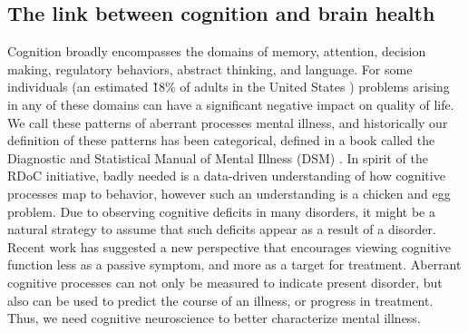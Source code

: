 \documentclass{report}
\begin{document}
\subsection{The link between cognition and brain health}
Cognition broadly encompasses the domains of memory, attention, decision making, regulatory behaviors, abstract thinking, and language. For some individuals (an estimated \~18\% of adults in the United States \cite{Samhsa_undated-fo}) problems arising in any of these domains can have a significant negative impact on quality of life. We call these patterns of aberrant processes mental illness, and historically our definition of these patterns has been categorical, defined in a book called the Diagnostic and Statistical Manual of Mental Illness (DSM) \cite{american2013diagnostic}. In spirit of the RDoC initiative, badly needed is a data-driven understanding of how cognitive processes map to behavior, however such an understanding is a chicken and egg problem. Due to observing cognitive deficits in many disorders, it might be a natural strategy to assume that such deficits appear as a result of a disorder. Recent work \cite{Etkin2013-lo} has suggested a new perspective that encourages viewing cognitive function less as a passive symptom, and more as a target for treatment. Aberrant cognitive processes can not only be measured to indicate present disorder, but also can be used to predict the course of an illness, or progress in treatment. Thus, we need cognitive neuroscience to better characterize mental illness.
\end{document}
